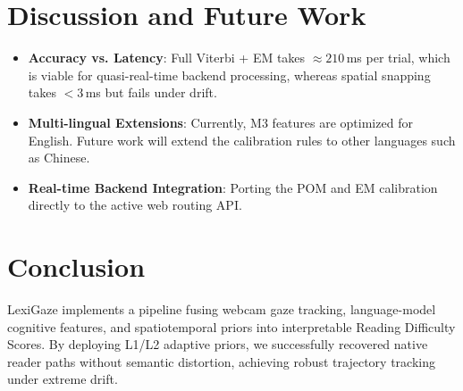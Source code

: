 \documentclass[sigconf]{acmart}
\begin{document}
\section{Discussion and Future Work}
\begin{itemize}
    \item \textbf{Accuracy vs. Latency}: Full Viterbi + EM takes $\approx 210$\,ms per trial, which is viable for quasi-real-time backend processing, whereas spatial snapping takes $<3$\,ms but fails under drift.
    \item \textbf{Multi-lingual Extensions}: Currently, M3 features are optimized for English. Future work will extend the calibration rules to other languages such as Chinese.
    \item \textbf{Real-time Backend Integration}: Porting the POM and EM calibration directly to the active web routing API.
\end{itemize}

\section{Conclusion}
LexiGaze implements a pipeline fusing webcam gaze tracking, language-model cognitive features, and spatiotemporal priors into interpretable Reading Difficulty Scores. By deploying L1/L2 adaptive priors, we successfully recovered native reader paths without semantic distortion, achieving robust trajectory tracking under extreme drift.



\end{document}
